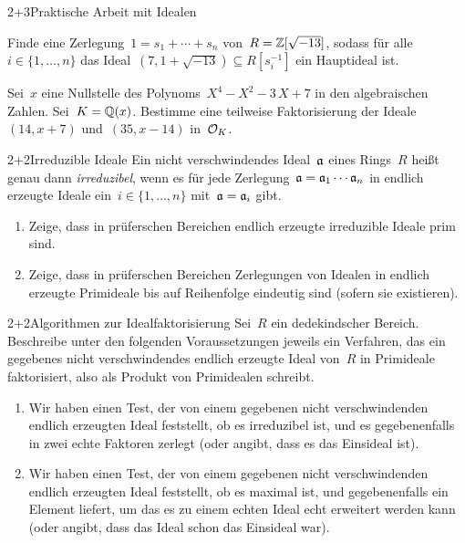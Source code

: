 \documentclass{algblatt}
\begin{document}

\begin{aufgabeE}{2+3}{Praktische Arbeit mit Idealen}
\item Finde eine Zerlegung~$1 = s_1 + \cdots + s_n$ von~$R = \ZZ[\sqrt{-13}]$,
sodass für alle~$i \in \{ 1,\ldots,n \}$ das Ideal~$(7, 1 + \sqrt{-13})
\subseteq R[s_i^{-1}]$ ein Hauptideal ist.
\item Sei~$x$ eine Nullstelle des Polynoms~$X^4-X^2-3\,X+7$ in den
algebraischen Zahlen. Sei~$K = \QQ(x)$. Bestimme eine teilweise Faktorisierung
der Ideale~$(14,x+7)$ und~$(35,x-14)$ in~$\O_K$.
\end{aufgabeE}

\begin{aufgabe}{2+2}{Irreduzible Ideale}
Ein nicht verschwindendes Ideal~$\aa$ eines Rings~$R$ heißt genau dann
\emph{irreduzibel}, wenn es für jede Zerlegung~$\aa = \aa_1 \cdots \aa_n$ in
endlich erzeugte Ideale ein~$i \in \{1,\ldots,n\}$ mit~$\aa = \aa_i$ gibt.
\begin{enumerate}
\item Zeige, dass in prüferschen Bereichen endlich erzeugte irreduzible Ideale prim sind.
\item Zeige, dass in prüferschen Bereichen Zerlegungen von Idealen in endlich
erzeugte Primideale
bis auf Reihenfolge eindeutig sind (sofern sie existieren).
\end{enumerate}
\end{aufgabe}

\begin{aufgabe}{2+2}{Algorithmen zur Idealfaktorisierung}
Sei~$R$ ein dedekindscher Bereich. Beschreibe unter den folgenden
Voraussetzungen jeweils ein Verfahren, das ein gegebenes nicht verschwindendes
endlich erzeugte Ideal von~$R$ in Primideale faktorisiert, also als Produkt von
Primidealen schreibt.
\begin{enumerate}
\item Wir haben einen Test, der von einem gegebenen nicht verschwindenden endlich erzeugten Ideal feststellt,
ob es irreduzibel ist, und es gegebenenfalls in zwei echte Faktoren zerlegt
(oder angibt, dass es das Einsideal ist).
\item Wir haben einen Test, der von einem gegebenen nicht verschwindenden endlich erzeugten Ideal
feststellt, ob es maximal ist, und gegebenenfalls ein Element liefert, um das
es zu einem echten Ideal echt erweitert werden kann (oder angibt, dass das
Ideal schon das Einsideal war).
\end{enumerate}
\end{aufgabe}
\end{document}
